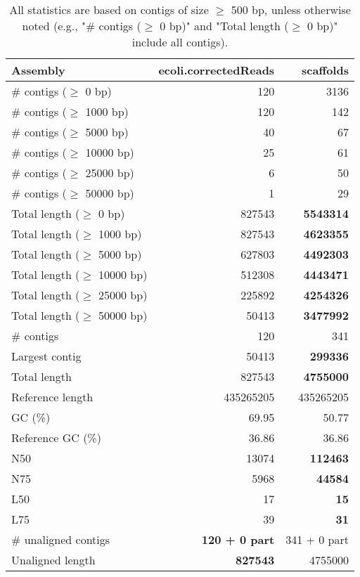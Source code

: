 \documentclass[12pt,a4paper]{article}
\begin{document}
\begin{table}[ht]
\begin{center}
\caption{All statistics are based on contigs of size $\geq$ 500 bp, unless otherwise noted (e.g., "\# contigs ($\geq$ 0 bp)" and "Total length ($\geq$ 0 bp)" include all contigs).}
\begin{tabular}{|l*{2}{|r}|}
\hline
Assembly & ecoli.correctedReads & scaffolds \\ \hline
\# contigs ($\geq$ 0 bp) & 120 & 3136 \\ \hline
\# contigs ($\geq$ 1000 bp) & 120 & 142 \\ \hline
\# contigs ($\geq$ 5000 bp) & 40 & 67 \\ \hline
\# contigs ($\geq$ 10000 bp) & 25 & 61 \\ \hline
\# contigs ($\geq$ 25000 bp) & 6 & 50 \\ \hline
\# contigs ($\geq$ 50000 bp) & 1 & 29 \\ \hline
Total length ($\geq$ 0 bp) & 827543 & {\bf 5543314} \\ \hline
Total length ($\geq$ 1000 bp) & 827543 & {\bf 4623355} \\ \hline
Total length ($\geq$ 5000 bp) & 627803 & {\bf 4492303} \\ \hline
Total length ($\geq$ 10000 bp) & 512308 & {\bf 4443471} \\ \hline
Total length ($\geq$ 25000 bp) & 225892 & {\bf 4254326} \\ \hline
Total length ($\geq$ 50000 bp) & 50413 & {\bf 3477992} \\ \hline
\# contigs & 120 & 341 \\ \hline
Largest contig & 50413 & {\bf 299336} \\ \hline
Total length & 827543 & {\bf 4755000} \\ \hline
Reference length & 435265205 & 435265205 \\ \hline
GC (\%) & 69.95 & 50.77 \\ \hline
Reference GC (\%) & 36.86 & 36.86 \\ \hline
N50 & 13074 & {\bf 112463} \\ \hline
N75 & 5968 & {\bf 44584} \\ \hline
L50 & 17 & {\bf 15} \\ \hline
L75 & 39 & {\bf 31} \\ \hline
\# unaligned contigs & {\bf 120 + 0 part} & 341 + 0 part \\ \hline
Unaligned length & {\bf 827543} & 4755000 \\ \hline

\end{tabular}
\end{center}
\end{table}
\end{document}
